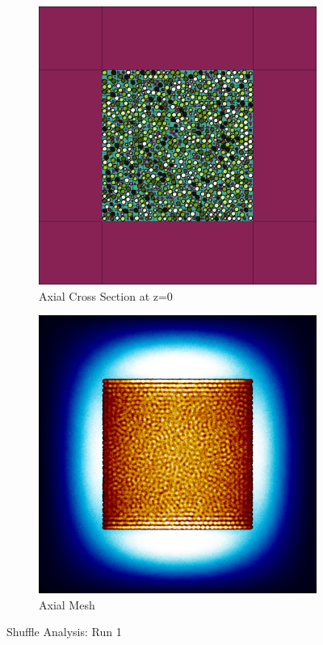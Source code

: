 \begin{figure}[H]
\begin{subfigure}{0.45\textwidth}
  \includegraphics[width=0.95\linewidth]{figures/1234560/1234560-v}
  \caption{Axial Cross Section at z=0 }
  \label{fig:1234560-v}
\end{subfigure}
%
\begin{subfigure}{0.45\textwidth}
  \includegraphics[width=0.95\linewidth]{figures/1234560/1234560-vm}
  \caption{Axial Mesh}
  \label{fig:1234560-vm}
\end{subfigure}
%
\caption{Shuffle Analysis: Run 1}
\label{fig:1234560}
\end{figure}